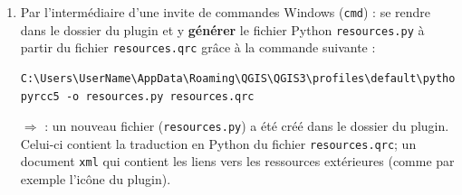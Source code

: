 \documentclass[11pt]{article}
\begin{document}
\begin{enumerate}
\item Par l'intermédiaire d'une invite de commandes Windows (\texttt{cmd}) : se rendre dans le dossier du plugin et y \textbf{générer} le fichier Python \texttt{resources.py} à partir du fichier \texttt{resources.qrc} grâce à la commande suivante : 
\vspace*{-1em}
\begin{center}
\begin{minipage}[t]{0.92\textwidth}
\begin{verbatim}
C:\Users\UserName\AppData\Roaming\QGIS\QGIS3\profiles\default\python\plugins\helloworld>
pyrcc5 -o resources.py resources.qrc
\end{verbatim}
\end{minipage}
\end{center}
\vspace*{1em}






$\Rightarrow$ \underline{}:  un nouveau fichier (\og{}\texttt{resources.py}\fg{}) a été créé dans le dossier du plugin. Celui-ci contient la traduction en Python du fichier \og{}\texttt{resources.qrc}\fg{}; un document \texttt{xml} qui contient les liens vers les ressources extérieures (comme par exemple l'icône du plugin). 

\end{enumerate}
\end{document}
